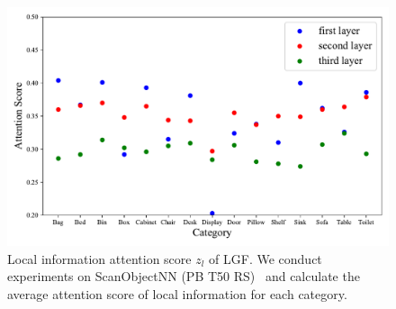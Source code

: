 \begin{figure}
    \centering
    \includegraphics[width=\linewidth]{fig/supplement/hardest.pdf}
    \caption{Local information attention score $z_l$ of LGF. We conduct experiments on ScanObjectNN (PB T50 RS)~\cite{uy2019revisiting} and calculate the average attention score of local information for each category.
}
    \label{fig:attention_score}
\end{figure}